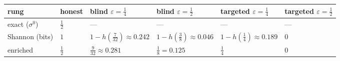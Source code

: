 {\def\LTcaptype{none} %
\begin{longtable}[]{@{}
  >{\raggedright\arraybackslash}p{}
  >{\raggedright\arraybackslash}p{}
  >{\raggedright\arraybackslash}p{}
  >{\raggedright\arraybackslash}p{}
  >{\raggedright\arraybackslash}p{}
  >{\raggedright\arraybackslash}p{}@{}}
\toprule\noalign{}
\begin{minipage}[b]{\linewidth}\raggedright
rung
\end{minipage} & \begin{minipage}[b]{\linewidth}\raggedright
honest
\end{minipage} & \begin{minipage}[b]{\linewidth}\raggedright
blind \(\varepsilon = \tfrac14\)
\end{minipage} & \begin{minipage}[b]{\linewidth}\raggedright
blind \(\varepsilon = \tfrac12\)
\end{minipage} & \begin{minipage}[b]{\linewidth}\raggedright
targeted \(\varepsilon = \tfrac14\)
\end{minipage} & \begin{minipage}[b]{\linewidth}\raggedright
targeted \(\varepsilon = \tfrac12\)
\end{minipage} \\
\midrule\noalign{}
\endhead
\bottomrule\noalign{}
\endlastfoot
exact (\(\sigma^0\)) & \(\tfrac12\) & ---\hspace{0pt} & ---\hspace{0pt} & ---\hspace{0pt} & ---\hspace{0pt} \\
Shannon (bits) & \(1\) & \(1 - h(\tfrac{7}{32}) \approx 0.242\) & \(1 - h(\tfrac38) \approx 0.046\) & \(1 - h(\tfrac14) \approx 0.189\) & \(0\) \\
enriched & \(\tfrac12\) & \(\tfrac{9}{32} \approx 0.281\) & \(\tfrac18 = 0.125\) & \(\tfrac14\) & \(0\) \\
\end{longtable}
}

